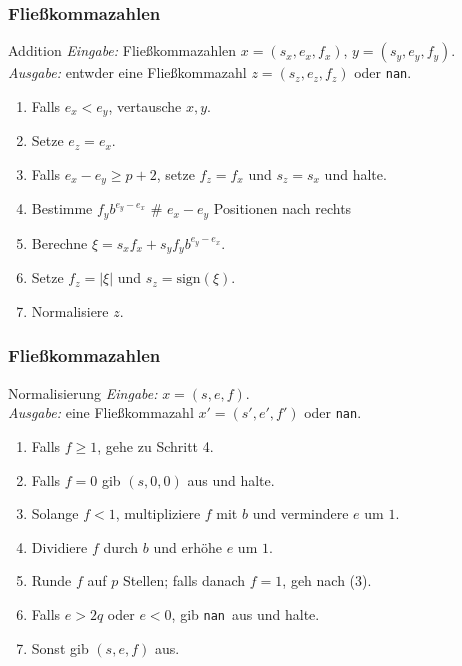 \documentclass{beamer}
\newcommand\nan{{\tt nan}}
\newcommand\sign{\mathrm{sign}}
\newcommand{\mytitle}{Flie\ss kommazahlen}
\begin{document}
\begin{frame}\frametitle{\mytitle}
	\begin{block}{Addition}
		{\em Eingabe:} Flie\ss kommazahlen $x=(s_x,e_x,f_x)$, $y=(s_y,e_y,f_y)$.\\
		{\em Ausgabe:} entwder eine Flie\ss kommazahl $z=(s_z,e_z,f_z)$ oder \nan.
		\begin{enumerate}
			\item Falls $e_x<e_y$, vertausche $x,y$.
			\item Setze $e_z=e_x$.
			\item Falls $e_x-e_y\geq p+2$, setze $f_z= f_x$ und $s_z=s_x$ und halte.
			\item Bestimme $f_y b^{e_y-e_x}$ \hfill\alert{\# $e_x-e_y$ Positionen nach rechts}
			\item Berechne $\xi= s_xf_x+s_yf_y b^{e_y-e_x}$.
			\item Setze $f_z=|\xi|$ und $s_z=\sign(\xi)$.
			\item Normalisiere $z$.
		\end{enumerate}
	\end{block}
\end{frame}

\begin{frame}\frametitle{\mytitle}
	\begin{block}{Normalisierung}
		{\em Eingabe:} $x=(s,e,f)$.\\
		{\em Ausgabe:} eine Flie\ss kommazahl $x'=(s',e',f')$ oder \nan.
		\begin{enumerate}
			\item Falls $f\geq1$, gehe zu Schritt 4.
			\item Falls $f=0$ gib $(s,0,0)$ aus und halte.
			\item Solange $f<1$, multipliziere $f$ mit $b$ und vermindere $e$ um $1$.
			\item Dividiere $f$ durch $b$ und  erh\"ohe $e$ um $1$.
			\item Runde $f$ auf $p$ Stellen; falls danach $f=1$, geh nach (3).
			\item Falls $e>2q$ oder $e<0$, gib \nan\ aus und halte.
			\item Sonst gib $(s,e,f)$ aus.
		\end{enumerate}
	\end{block}
\end{frame}
\end{document}
